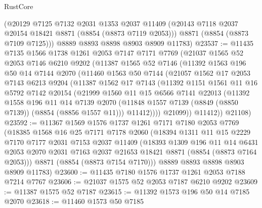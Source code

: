 \begin{lexlean}{RustCore}
\begin{coremodule}
      (@20129
        @7125
        @7132
        @2031
        @1353
        @2037
        @11409
        (@20143 @7118 @2037 @20154 @18421 @8871 (@8854 (@8873 @7119 @2053)))
        @8871
        (@8854 (@8873 @7109 @7125)))
      @8889
      @8893
      @8898
      @8903
      @8909
      @11783)
@23537 := @11435
    @7135
    @1566
    @1738
    @1261
    @2053
    @7147
    @7171
    @7769
    (@21037
      @1565
      @52
      @2053
      @7146
      @6210
      @9202
      (@11387
        @1565
        @52
        @7146
        (@11392
          @1563
          @196
          @50
          @14
          @7144
          @2070
          (@11460
            @1563
            @50
            @7144
            (@21057
              @1562
              @17
              @2053
              @7143
              @6213
              @9204
              (@11387
                @1562
                @17
                @7143
                (@11392
                  @1151
                  @1561
                  @11
                  @16
                  @5792
                  @7142
                  @20154
                  (@21999
                    @1560
                    @11
                    @15
                    @6566
                    @7141
                    @22013
                    (@11392
                      @1558
                      @196
                      @11
                      @14
                      @7139
                      @2070
                      (@11848 @1557 @7139 (@8849 (@8850 @7139)) (@8854 (@8856 @1557 @11)))
                      @11412))))
              @21099))
          @11412))
      @21108)
@23592 := @11367
    @1569
    @1576
    @1737
    @1261
    @7171
    @7180
    @2053
    @7769
    (@18385
      @1568
      @16
      @25
      @7171
      @7178
      @2060
      (@18394
        @1311
        @11
        @15
        @2229
        @7170
        @7177
        @2031
        @7153
        @2037
        @11409
        (@18393
          @1309
          @196
          @11
          @14
          @6431
          @2053
          @2070
          @2031
          @7163
          @2037
          @21653
          @18421
          @8871
          (@8854 (@8873 @7164 @2053)))
        @8871
        (@8854 (@8873 @7154 @7170)))
      @8889
      @8893
      @8898
      @8903
      @8909
      @11783)
@23600 := @11435 @7180 @1576 @1737 @1261 @2053 @7188 @7214 @7767
@23606 := @21037 @1575 @52 @2053 @7187 @6210 @9202
@23609 := @11387 @1575 @52 @7187
@23615 := @11392 @1573 @196 @50 @14 @7185 @2070
@23618 := @11460 @1573 @50 @7185

\end{coremodule}
\end{lexlean}
